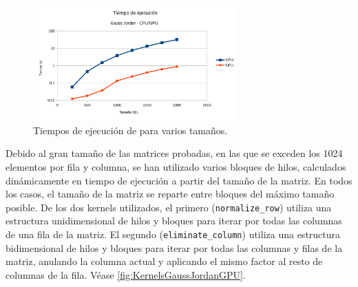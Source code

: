 \begin{figure}[h]
    \centering
    \includegraphics[width=0.7\textwidth]{img/EQ_GPU_TIME.pdf}
    \caption{Tiempos de ejecución de para varios tamaños.}
    \label{fig:gpu_time}
\end{figure}

Debido al gran tamaño de las matrices probadas,
en las que se exceden los 1024 elementos por fila y columna,
se han utilizado varios bloques de hilos,
calculados dinámicamente en tiempo de ejecución
a partir del tamaño de la matriz.
En todos los casos, el tamaño de la matriz se reparte entre bloques
del máximo tamaño posible.
De los dos kernels utilizados, 
el primero (\texttt{normalize\_row})
utiliza una estructura unidimensional de hilos y bloques
para iterar por todas las columnas de una fila
de la matriz.
El segundo (\texttt{eliminate\_column})
utiliza una estructura bidimensional de hilos y bloques
para iterar por todas las columnas y filas de la matriz,
anulando la columna actual y aplicando el mismo
factor al resto de columnas de la fila.
Véase \autoref{fig:KernelsGaussJordanGPU}.

